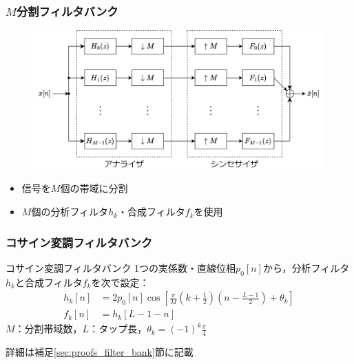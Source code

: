 \documentclass[14pt,xcolor=dvipsnames,table,dvipdfmx]{beamer}
\begin{document}
\begin{frame}[c]
    \frametitle{$M$分割フィルタバンク\cite{kiya1995}}
    \begin{figure}
        \includegraphics[width=120mm]{./figs/filter_bank.drawio.png}
    \end{figure}
    \begin{itemize}
        \item 信号を$M$個の帯域に分割
        \item $M$個の分析フィルタ$h_{k}$・合成フィルタ$f_{k}$を使用
    \end{itemize}
\end{frame}

\begin{frame}[c]
    \frametitle{コサイン変調フィルタバンク\cite{kiya1995,vaidyanathan2002}}
    \begin{block}{コサイン変調フィルタバンク}
        1つの実係数・直線位相$p_{0}[n]$から，分析フィルタ$h_{k}$と合成フィルタ$f_{k}$を次で設定：
        \begin{align}
            h_{k}[n] &= 2 p_{0}[n] \cos \left[ \frac{\pi}{M} \left( k + \frac{1}{2} \right) \left( n - \frac{L - 1}{2} \right) + \theta_{k} \right] \label{eq:cos_modulated_analysis_filter} \\
            f_{k}[n] &= h_{k}[L - 1 - n] \label{eq:cos_modulated_synthesis_filter}
        \end{align}
        $M$：分割帯域数，$L$：タップ長，$\theta_{k} = (-1)^{k} \frac{\pi}{4}$
    \end{block}
    詳細は補足\ref{sec:proofs_filter_bank}節に記載
\end{frame}
\end{document}
